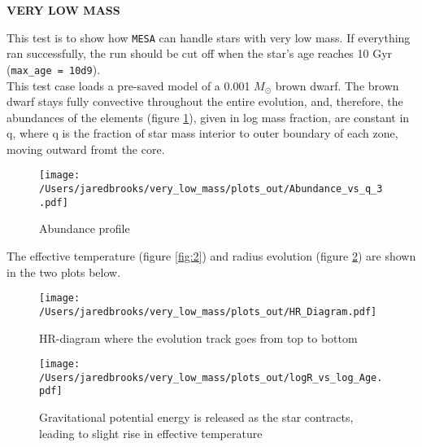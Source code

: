 \documentclass{article}
\begin{document}
	\begin{center}
		\begin{Large}
			\textbf{VERY LOW MASS}\\
		\end{Large}
	\end{center}

        This test is to show how \texttt{MESA} can handle stars with very low mass.  If everything ran successfully, the run should be cut off when the star's age reaches 10 Gyr (\texttt{max\_age = 10d9}).\\

        This test case loads a pre-saved model of a 0.001 $M_\odot$ brown dwarf.  The brown dwarf stays fully convective throughout the entire evolution, and, therefore, the abundances of the elements (figure \ref{fig:1}), given in log mass fraction, are constant in q, where q is the fraction of star mass interior to outer boundary of each zone, moving outward fromt the core.

	\begin{figure}[H]
		\centering
		\texttt{[image: /Users/jaredbrooks/very\_low\_mass/plots\_out/Abundance\_vs\_q\_3.pdf]}
		\caption{Abundance profile}
		\label{fig:1}
	\end{figure}

        \pagebreak

        The effective temperature (figure \ref{fig:2}) and radius evolution (figure \ref{fig:3}) are shown in the two plots below.

        \begin{figure}[H]
                \begin{minipage}[b]{0.5\linewidth}
                       \centering
                       \texttt{[image: /Users/jaredbrooks/very\_low\_mass/plots\_out/HR\_Diagram.pdf]}
                       \caption{\footnotesize HR-diagram where the evolution track goes from top to bottom}
                       \label{fig:2}
                \end{minipage}
                \hspace{0cm}
                \begin{minipage}[b]{0.5\linewidth}
                       \centering
                       \texttt{[image: /Users/jaredbrooks/very\_low\_mass/plots\_out/logR\_vs\_log\_Age.pdf]}
                       \caption{\footnotesize Gravitational potential energy is released as the star contracts, leading to slight rise in effective temperature}
                       \label{fig:3}
                \end{minipage}
        \end{figure}
\end{document}
